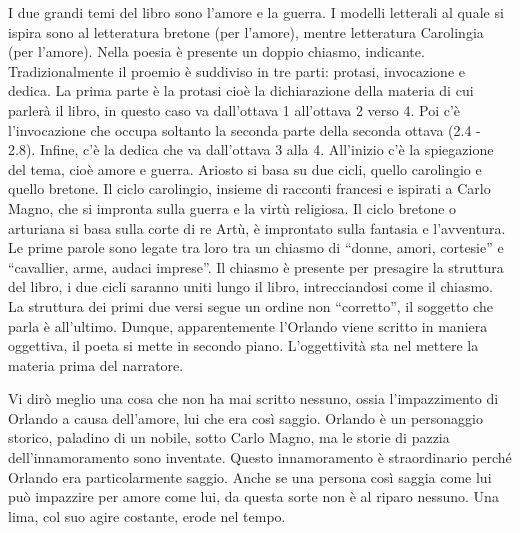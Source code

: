 \documentclass[a4paper]{article}
\begin{document}
I due grandi temi del libro sono l'amore e la guerra.
I modelli letterali al quale si ispira sono al letteratura bretone (per l'amore),
mentre letteratura Carolingia (per l'amore).
Nella poesia è presente un doppio chiasmo, indicante.
Tradizionalmente il proemio è suddiviso in tre parti: protasi, invocazione e dedica.
La prima parte è la protasi cioè la dichiarazione della materia di
cui parlerà il libro, in questo caso va dall'ottava 1 all'ottava 2 verso 4.
Poi c'è l'invocazione che occupa soltanto la seconda parte della seconda ottava
(2.4 - 2.8). Infine, c'è la dedica che va dall'ottava 3 alla 4.
All'inizio c'è la spiegazione del tema, cioè amore e guerra.
Ariosto si basa su due cicli, quello carolingio e quello bretone.
Il ciclo carolingio, insieme di racconti francesi e ispirati a Carlo Magno,
che si impronta sulla guerra e la virtù religiosa.
Il ciclo bretone o arturiana si basa sulla corte di re Artù,
è improntato sulla fantasia e l'avventura. Le prime parole sono legate
tra loro tra un chiasmo di “donne, amori, cortesie” e “cavallier, arme,
audaci imprese”. Il chiasmo è presente per presagire la struttura del libro,
i due cicli saranno uniti lungo il libro, intrecciandosi come il chiasmo. 
La struttura dei primi due versi segue un ordine non “corretto”,
il soggetto che parla è all'ultimo.
Dunque, apparentemente l'Orlando viene scritto in maniera oggettiva,
il poeta si mette in secondo piano.
L'oggettività sta nel mettere la materia prima del narratore.

\begin{center}
\begin{minipage}{0.5\textwidth}
\centering
{}
\end{minipage}
\end{center}

Vi dirò meglio una cosa che non ha mai scritto nessuno,
ossia l'impazzimento di Orlando a causa dell'amore,
lui che era così saggio.
Orlando è un personaggio storico, paladino di un nobile, sotto Carlo Magno,
ma le storie di pazzia dell'innamoramento sono inventate.
Questo innamoramento è straordinario perché Orlando era particolarmente saggio.
Anche se una persona così saggia come lui può impazzire per amore come lui,
da questa sorte non è al riparo nessuno.
Una lima, col suo agire costante, erode nel tempo.
\end{document}

